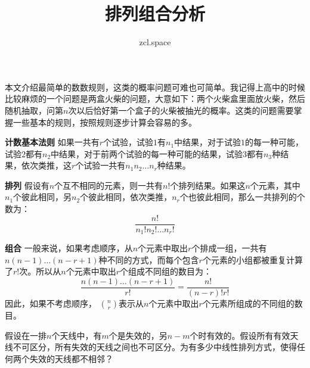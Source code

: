 \documentclass[10pt,a4paper,UTF8]{article}
\author{zcl.space}
\date{}
\title{排列组合分析}
\begin{document}
\maketitle
\tableofcontents
{}
本文介绍最简单的数数规则，这类的概率问题可难也可简单。我记得上高中的时候比较麻烦的一个问题是两盒火柴的问题，大意如下：两个火柴盒里面放火柴，然后随机抽取，问第\(n\)次以后恰好第一个盒子的火柴被抽光的概率。这类的问题需要掌握一些基本的规则，按照规则逐步计算会容易的多。


\textbf{计数基本法则} 如果一共有\(r\)个试验，试验\(1\)有\(n_{1}\)中结果，对于试验\(1\)的每一种可能，试验\(2\)都有\(n_{2}\)中结果，对于前两个试验的每一种可能的结果，试验\(3\)都有\(n_{3}\)种结果，依次类推，这\(r\)个试验一共有\(n_{1}n_{2}\ldots n_{r}\)种结果。

\textbf{排列} 假设有\(n\)个互不相同的元素，则一共有\(n!\)个排列结果。如果这\(n\)个元素，其中\(n_{1}\)个彼此相同，另\(n_{2}\)个彼此相同，依次类推，\(n_{r}\)个也彼此相同，那么一共排列的个数为：
\begin{equation}
\label{eq:1}
\frac{n!}{n_{1}!n_{2}!\ldots n_{r}!}
\end{equation}

\textbf{组合} 一般来说，如果考虑顺序，从\(n\)个元素中取出\(r\)个排成一组，一共有\(n(n-1)\ldots (n-r+1)\)种不同的方式，而每个包含\(r\)个元素的小组都被重复计算了\(r!\)次。所以从\(n\)个元素中取出\(r\)个组成不同组的数目为：
\begin{equation}
\label{eq:2}
\frac{n(n-1)\ldots (n-r+1)}{r!} = \frac{n!}{(n-r)!r!}
\end{equation}
因此，如果不考虑顺序， \(\binom{n}{r}\)表示从\(n\)个元素中取出\(r\)个元素所组成的不同组的数目。

\begin{instance}
假设在一排\(n\)个天线中，有\(m\)个是失效的，另\(n-m\)个时有效的。假设所有有效天线不可区分，所有失效的天线之间也不可区分。为有多少中线性排列方式，使得任何两个失效的天线都不相邻？
\end{instance}
\end{document}
